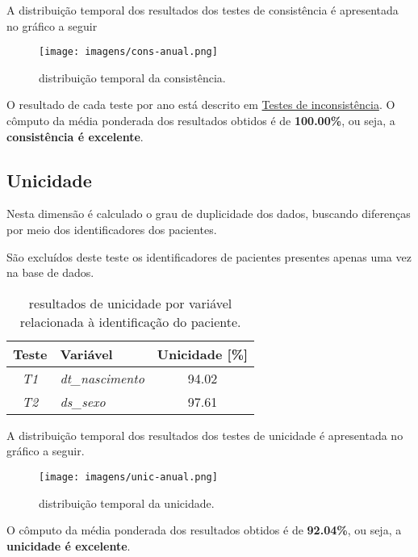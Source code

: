 \documentclass[
  12,
  table]{proadi}
\begin{document}
A distribuição temporal dos resultados dos testes de consistência é
apresentada no gráfico a seguir

\begin{figure}
\centering
\texttt{[image: imagens/cons-anual.png]}
\caption{distribuição temporal da consistência.}
\end{figure}

O resultado de cada teste por ano está descrito em
\protect\hyperlink{testes-de-inconsistuxeancia}{Testes de
inconsistência}. O cômputo da média ponderada dos resultados obtidos é
de \textbf{100.00\%}, ou seja, a \textbf{consistência é excelente}.

\hypertarget{unicidade}{%
\subsection{Unicidade}\label{unicidade}}

\label{sub:unicidade}

Nesta dimensão é calculado o grau de duplicidade dos dados, buscando
diferenças por meio dos identificadores dos pacientes.

São excluídos deste teste os identificadores de pacientes presentes
apenas uma vez na base de dados.

\begin{table}[H]

\caption{\label{tab:unnamed-chunk-19}resultados de unicidade por variável relacionada à identificação do paciente.}
\centering
\fontsize{10}{12}\selectfont
\begin{tabular}[t]{>{}c>{}lc}
\toprule
Teste & Variável & Unicidade [\%]\\
\midrule
\em{T1} & \em{dt\_nascimento} & 94.02\\
\em{T2} & \em{ds\_sexo} & 97.61\\
\bottomrule
\end{tabular}
\end{table}

A distribuição temporal dos resultados dos testes de unicidade é
apresentada no gráfico a seguir.

\begin{figure}
\centering
\texttt{[image: imagens/unic-anual.png]}
\caption{distribuição temporal da unicidade.}
\end{figure}

O cômputo da média ponderada dos resultados obtidos é de
\textbf{92.04\%}, ou seja, a \textbf{unicidade é excelente}.
\end{document}
